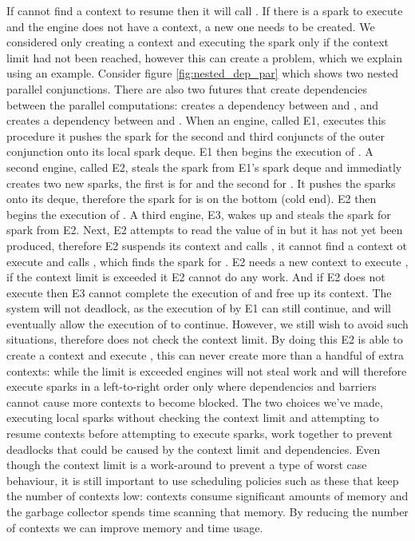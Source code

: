 If \idle cannot find a context to resume then it
will call \tryrunlocalspark.
If there is a spark to execute and the engine does not have a context,
a new one needs to be created.
We considered only creating a context and executing the spark only if the
context limit had not been reached,
however this can create a problem, which we explain using an example.
Consider figure \ref{fig:nested_dep_par} which shows two nested
parallel conjunctions.
There are also two futures that create dependencies between the parallel
computations:
 creates a dependency between  and ,
and  creates a dependency between  and .
When an engine, called E1,
executes this procedure it pushes the spark for the second and third
conjuncts of the outer conjunction onto its local spark deque.
E1 then begins the execution of .
A second engine, called E2,
steals the spark from E1's spark deque and immediatly creates two new
sparks, the first is for  and the second for .
It pushes the sparks onto its deque,
therefore the spark for  is on the bottom (cold end).
E2 then begins the execution of .
A third engine, E3,
wakes up and steals the spark for  spark from E2.
Next,
E2 attempts to read the value of  in  but it has not yet
been produced,
therefore E2 suspends its context and calls \idle, it cannot find a context
ot execute and calls \tryrunlocalspark,
which finds the spark for .
E2 needs a new context to execute , if the context limit is exceeded
it E2 cannot do any work.
And if E2 does not execute  then E3 cannot complete the execution of
 and free up its context.
The system will not deadlock, as the execution of  by E1 can still
continue, and will eventually allow the execution of  to continue.
However, we still wish to avoid such situations,
therefore \tryrunlocalspark does not check the context limit.
By doing this E2 is able to create a context and execute ,
this can never create more than a handful of extra contexts:
while the limit is exceeded engines will not steal work and will therefore
execute sparks in a left-to-right order only where dependencies and barriers
cannot cause more contexts to become blocked.
The two choices we've made,
executing local sparks without checking the context limit and
attempting to resume contexts before attempting to execute sparks,
work together to prevent deadlocks that could be caused by
the context limit and dependencies.
Even though the context limit is a work-around to prevent a type of worst
case behaviour,
it is still important to use scheduling policies such as these that keep the
number of contexts low:
contexts consume significant amounts of memory and
the garbage collector spends time scanning that memory.
By reducing the number of contexts we can improve memory and time usage.

